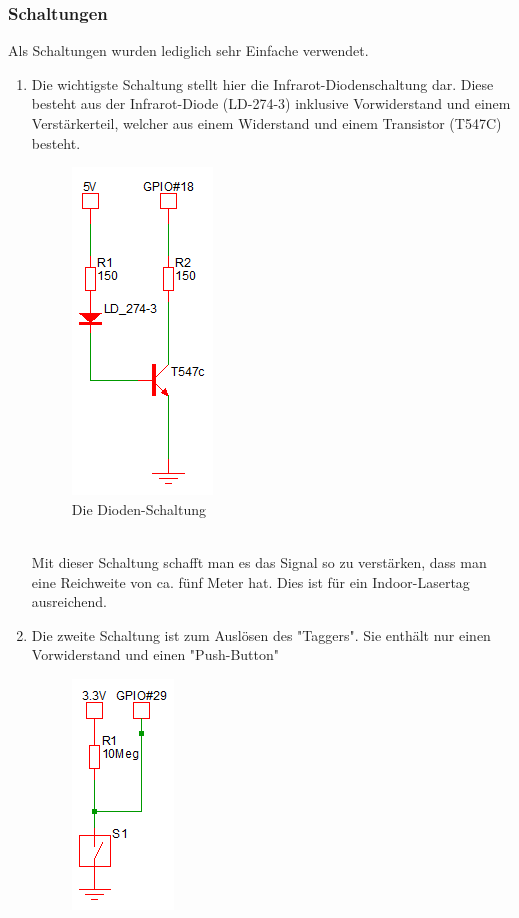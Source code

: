 \newpage
\subsubsection{Schaltungen}

Als Schaltungen wurden lediglich sehr Einfache verwendet. 
\begin{enumerate}
	\item Die wichtigste Schaltung stellt hier die Infrarot-Diodenschaltung dar. Diese besteht aus der Infrarot-Diode (LD-274-3) inklusive Vorwiderstand und einem Verstärkerteil, welcher aus einem Widerstand und einem Transistor (T547C) besteht.\\
	\begin{figure}[h]
		\centering
		\includegraphics[width=0.2 \textwidth]{./040-komponenten/010-hardware/Diodenschaltung.png}
		\caption{Die Dioden-Schaltung}
		\label{fig:Bild2Hardware}
	\end{figure}\\
	Mit dieser Schaltung schafft man es das Signal so zu verstärken, dass man eine Reichweite von ca. fünf Meter hat. Dies ist für ein Indoor-Lasertag ausreichend.\\
	\item Die zweite Schaltung ist zum Auslösen des "Taggers". Sie enthält nur einen Vorwiderstand und einen "Push-Button"\\
	\begin{figure}[h]
		\centering
		\includegraphics[width=0.2 \textwidth]{./040-komponenten/010-hardware/Button.png}

\end{figure}
\end{enumerate}
